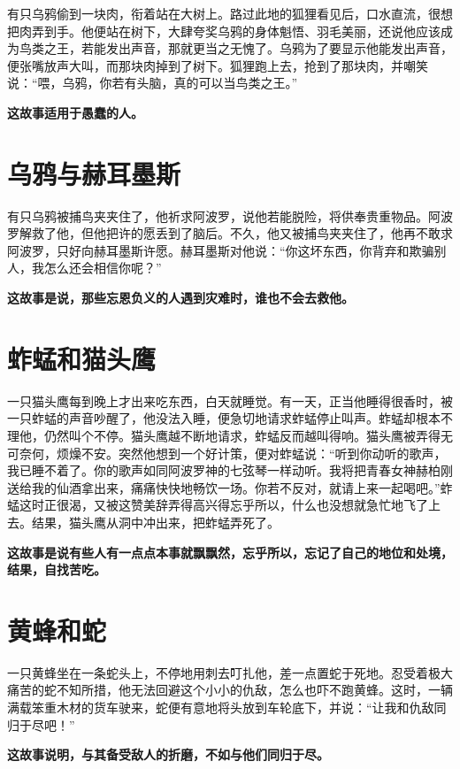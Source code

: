 有只乌鸦偷到一块肉，衔着站在大树上。路过此地的狐狸看见后，口水直流，很想把肉弄到手。他便站在树下，大肆夸奖乌鸦的身体魁悟、羽毛美丽，还说他应该成为鸟类之王，若能发出声音，那就更当之无愧了。乌鸦为了要显示他能发出声音，便张嘴放声大叫，而那块肉掉到了树下。狐狸跑上去，抢到了那块肉，并嘲笑说：“喂，乌鸦，你若有头脑，真的可以当鸟类之王。”

{\bfseries \color{red}这故事适用于愚蠢的人。}

\section{乌鸦与赫耳墨斯}

有只乌鸦被捕鸟夹夹住了，他祈求阿波罗，说他若能脱险，将供奉贵重物品。阿波罗解救了他，但他把许的愿丢到了脑后。不久，他又被捕鸟夹夹住了，他再不敢求阿波罗，只好向赫耳墨斯许愿。赫耳墨斯对他说：“你这坏东西，你背弃和欺骗别人，我怎么还会相信你呢？”

{\bfseries \color{red}这故事是说，那些忘恩负义的人遇到灾难时，谁也不会去救他。}

\section{蚱蜢和猫头鹰}

一只猫头鹰每到晚上才出来吃东西，白天就睡觉。有一天，正当他睡得很香时，被一只蚱蜢的声音吵醒了，他没法入睡，便急切地请求蚱蜢停止叫声。蚱蜢却根本不理他，仍然叫个不停。猫头鹰越不断地请求，蚱蜢反而越叫得响。猫头鹰被弄得无可奈何，烦燥不安。突然他想到一个好计策，便对蚱蜢说：“听到你动听的歌声，我已睡不着了。你的歌声如同阿波罗神的七弦琴一样动听。我将把青春女神赫柏刚送给我的仙酒拿出来，痛痛快快地畅饮一场。你若不反对，就请上来一起喝吧。”蚱蜢这时正很渴，又被这赞美辞弄得高兴得忘乎所以，什么也没想就急忙地飞了上去。结果，猫头鹰从洞中冲出来，把蚱蜢弄死了。

{\bfseries \color{red}这故事是说有些人有一点点本事就飘飘然，忘乎所以，忘记了自己的地位和处境，结果，自找苦吃。}

\section{黄蜂和蛇}

一只黄蜂坐在一条蛇头上，不停地用刺去叮扎他，差一点置蛇于死地。忍受着极大痛苦的蛇不知所措，他无法回避这个小小的仇敌，怎么也吓不跑黄蜂。这时，一辆满载笨重木材的货车驶来，蛇便有意地将头放到车轮底下，并说：“让我和仇敌同归于尽吧！”

{\bfseries \color{red}这故事说明，与其备受敌人的折磨，不如与他们同归于尽。}

